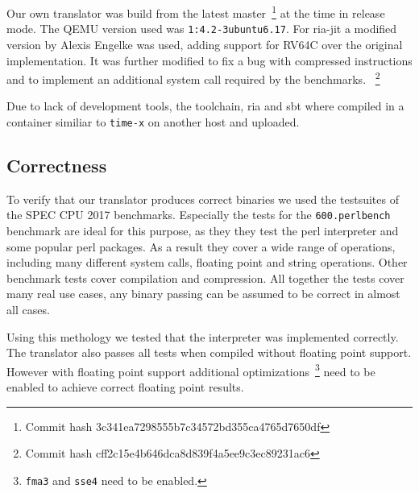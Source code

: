 \documentclass[course=eragp]{aspdoc}
\begin{document}
\par

Our own translator was build from the latest master~\footnote{Commit hash 3c341ea7298555b7c34572bd355ca4765d7650df} at the time in release mode.
The QEMU version used was \texttt{1:4.2-3ubuntu6.17}.
For ria-jit a modified version by Alexis Engelke was used, adding support for RV64C over the original implementation.
It was further modified to fix a bug with compressed instructions and to implement an additional system call required by the benchmarks.
~\footnote{Commit hash cff2c15e4b646dca8d839f4a5ee9c3ec89231ac6}

\par

Due to lack of development tools, the toolchain, ria and sbt where compiled in a container similiar to \texttt{time-x} on another host and uploaded. %


\subsection{Correctness}

To verify that our translator produces correct binaries we used the testsuites of the SPEC CPU 2017 benchmarks.
Especially the tests for the \texttt{600.perlbench} benchmark are ideal for this purpose, as they they test the perl interpreter and some popular perl packages.
As a result they cover a wide range of operations, including many different system calls, floating point and string operations.
Other benchmark tests cover compilation and compression.
All together the tests cover many real use cases, any binary passing can be assumed to be correct in almost all cases.

\par

Using this methology we tested that the interpreter was implemented correctly.
The translator also passes all tests when compiled without floating point support.
However with floating point support additional optimizations~\footnote{\texttt{fma3} and \texttt{sse4} need to be enabled.} need to be enabled to achieve correct floating point results.
\end{document}
